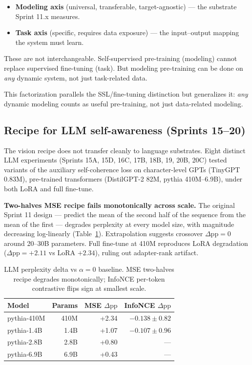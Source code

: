 \documentclass[11pt]{article}
\begin{document}
\begin{itemize}
    \item \textbf{Modeling axis} (universal, transferable, target-agnostic) --- the substrate Sprint 11.x measures.
    \item \textbf{Task axis} (specific, requires data exposure) --- the input--output mapping the system must learn.
\end{itemize}

These are not interchangeable. Self-supervised pre-training (modeling) cannot replace supervised fine-tuning (task). But modeling pre-training can be done on \emph{any} dynamic system, not just task-related data.

This factorization parallels the SSL/fine-tuning distinction but generalizes it: \emph{any} dynamic modeling counts as useful pre-training, not just data-related modeling.

\subsection{Recipe for LLM self-awareness (Sprints 15--20)}

The vision recipe does not transfer cleanly to language substrates. Eight distinct LLM experiments (Sprints 15A, 15D, 16C, 17B, 18B, 19, 20B, 20C) tested variants of the auxiliary self-coherence loss on character-level GPTs (TinyGPT 0.83M), pre-trained transformers (DistilGPT-2 82M, pythia 410M--6.9B), under both LoRA and full fine-tune.

\textbf{Two-halves MSE recipe fails monotonically across scale.} The original Sprint 11 design --- predict the mean of the second half of the sequence from the mean of the first --- degrades perplexity at every model size, with magnitude decreasing log-linearly (Table~\ref{tab:llm-scale}). Extrapolation suggests crossover $\Delta\text{pp}=0$ around 20--30B parameters. Full fine-tune at 410M reproduces LoRA degradation ($\Delta\text{pp}=+2.11$ vs LoRA $+2.34$), ruling out adapter-rank artifact.

\begin{table}[h]
\centering
\begin{tabular}{lrrr}
\hline
Model & Params & MSE $\Delta\text{pp}$ & InfoNCE $\Delta\text{pp}$ \\
\hline
pythia-410M & 410M & +2.34 & $-0.138 \pm 0.82$ \\
pythia-1.4B & 1.4B & +1.07 & $-0.107 \pm 0.96$ \\
pythia-2.8B & 2.8B & +0.80 & --- \\
pythia-6.9B & 6.9B & +0.43 & --- \\
\hline
\end{tabular}
\caption{LLM perplexity delta vs $\alpha=0$ baseline. MSE two-halves recipe degrades monotonically; InfoNCE per-token contrastive flips sign at smallest scale.}
\label{tab:llm-scale}
\end{table}
\end{document}
